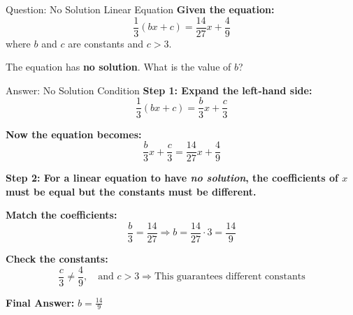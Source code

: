 \documentclass{beamer}
\begin{document}
\begin{frame}{Question: No Solution Linear Equation}
    \textbf{Given the equation:}
    \[
    \frac{1}{3}(bx + c) = \frac{14}{27}x + \frac{4}{9}
    \]
    where \(b\) and \(c\) are constants and \(c > 3\). 

    \vspace{1em}
    The equation has \textbf{no solution}. What is the value of \(b\)?
\end{frame}

\begin{frame}{Answer: No Solution Condition}
    \textbf{Step 1: Expand the left-hand side:}
    \[
    \frac{1}{3}(bx + c) = \frac{b}{3}x + \frac{c}{3}
    \]

    \textbf{Now the equation becomes:}
    \[
    \frac{b}{3}x + \frac{c}{3} = \frac{14}{27}x + \frac{4}{9}
    \]

    \vspace{1em}
    \textbf{Step 2: For a linear equation to have \emph{no solution}, the coefficients of \(x\) must be equal but the constants must be different.}

    \vspace{0.5em}
    \textbf{Match the coefficients:}
    \[
    \frac{b}{3} = \frac{14}{27} \Rightarrow b = \frac{14}{27} \cdot 3 = \frac{14}{9}
    \]

    \textbf{Check the constants:}
    \[
    \frac{c}{3} \neq \frac{4}{9}, \quad \text{and } c > 3 \Rightarrow \text{This guarantees different constants}
    \]

    \vspace{1em}
    \textbf{Final Answer:} \(\boxed{b = \frac{14}{9}}\)
\end{frame}
\end{document}
